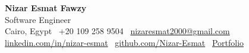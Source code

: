 {\LARGE \textbf{Nizar Esmat Fawzy}}\\[0.15em]
Software Engineer\\[0.25em]
Cairo, Egypt \textbar\ +20 109 258 9504 \textbar\ \href{mailto:nizaresmat2000@gmail.com}{nizaresmat2000@gmail.com}\\[0.1em]
\href{https://www.linkedin.com/in/nizar-esmat/}{linkedin.com/in/nizar-esmat} \textbar\
\href{https://github.com/Nizar-Esmat}{github.com/Nizar-Esmat} \textbar\
\href{https://portofilo-psi.vercel.app/}{Portfolio}
